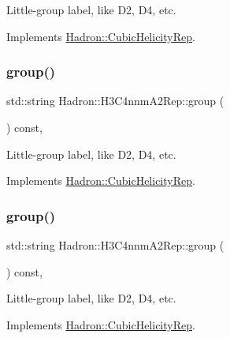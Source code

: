 Little-\/group label, like D2, D4, etc. 

Implements \mbox{\hyperlink{structHadron_1_1CubicHelicityRep_a101a7d76cd8ccdad0f272db44b766113}{Hadron\+::\+Cubic\+Helicity\+Rep}}.

\mbox{\label{structHadron_1_1H3C4nnmA2Rep_a057eae346cf6d906b23501bceef95e9b}} 
\subsubsection{\texorpdfstring{group()}{group()}\hspace{0.1cm}{\footnotesize\ttfamily [2/3]}}
{\footnotesize\ttfamily std\+::string Hadron\+::\+H3\+C4nnm\+A2\+Rep\+::group (\begin{DoxyParamCaption}{ }\end{DoxyParamCaption}) const\hspace{0.3cm}{\ttfamily [inline]}, {\ttfamily [virtual]}}

Little-\/group label, like D2, D4, etc. 

Implements \mbox{\hyperlink{structHadron_1_1CubicHelicityRep_a101a7d76cd8ccdad0f272db44b766113}{Hadron\+::\+Cubic\+Helicity\+Rep}}.

\mbox{\label{structHadron_1_1H3C4nnmA2Rep_a057eae346cf6d906b23501bceef95e9b}} 
\subsubsection{\texorpdfstring{group()}{group()}\hspace{0.1cm}{\footnotesize\ttfamily [3/3]}}
{\footnotesize\ttfamily std\+::string Hadron\+::\+H3\+C4nnm\+A2\+Rep\+::group (\begin{DoxyParamCaption}{ }\end{DoxyParamCaption}) const\hspace{0.3cm}{\ttfamily [inline]}, {\ttfamily [virtual]}}

Little-\/group label, like D2, D4, etc. 

Implements \mbox{\hyperlink{structHadron_1_1CubicHelicityRep_a101a7d76cd8ccdad0f272db44b766113}{Hadron\+::\+Cubic\+Helicity\+Rep}}.

